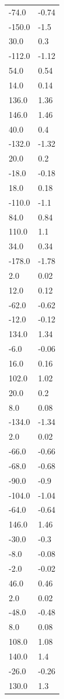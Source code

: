 \begin{longtable}{ll}
-74.0 & -0.74 \\
-150.0 & -1.5 \\
30.0 & 0.3 \\
-112.0 & -1.12 \\
54.0 & 0.54 \\
14.0 & 0.14 \\
136.0 & 1.36 \\
146.0 & 1.46 \\
40.0 & 0.4 \\
-132.0 & -1.32 \\
20.0 & 0.2 \\
-18.0 & -0.18 \\
18.0 & 0.18 \\
-110.0 & -1.1 \\
84.0 & 0.84 \\
110.0 & 1.1 \\
34.0 & 0.34 \\
-178.0 & -1.78 \\
2.0 & 0.02 \\
12.0 & 0.12 \\
-62.0 & -0.62 \\
-12.0 & -0.12 \\
134.0 & 1.34 \\
-6.0 & -0.06 \\
16.0 & 0.16 \\
102.0 & 1.02 \\
20.0 & 0.2 \\
8.0 & 0.08 \\
-134.0 & -1.34 \\
2.0 & 0.02 \\
-66.0 & -0.66 \\
-68.0 & -0.68 \\
-90.0 & -0.9 \\
-104.0 & -1.04 \\
-64.0 & -0.64 \\
146.0 & 1.46 \\
-30.0 & -0.3 \\
-8.0 & -0.08 \\
-2.0 & -0.02 \\
46.0 & 0.46 \\
2.0 & 0.02 \\
-48.0 & -0.48 \\
8.0 & 0.08 \\
108.0 & 1.08 \\
140.0 & 1.4 \\
-26.0 & -0.26 \\
130.0 & 1.3 \\

\end{longtable}
